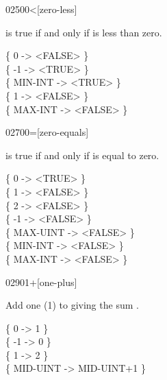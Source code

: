 \begin{worddef}[0less]{0250}{0<}[zero-less]
\item {}

	 is true if and only if  is less than zero.

	\begin{defer}
	\testing
		\{       0  -> <FALSE> \} \\
		\{      -1  -> <TRUE>  \} \\
		\{ MIN-INT  -> <TRUE>  \} \\
		\{       1  -> <FALSE> \} \\
		\{ MAX-INT  -> <FALSE> \}
	\end{defer}
\end{worddef}


\begin{worddef}{0270}{0=}[zero-equals]
\item {}

	 is true if and only if  is equal to zero.

	\begin{defer}
	\testing
		\{  0  -> <TRUE>  \} \\
		\{  1  -> <FALSE> \} \\
		\{  2  -> <FALSE> \} \\
		\{ -1  -> <FALSE> \} \\
		\{ MAX-UINT  -> <FALSE> \} \\
		\{ MIN-INT   -> <FALSE> \} \\
		\{ MAX-INT   -> <FALSE> \}
	\end{defer}
\end{worddef}


\begin{worddef}{0290}{1+}[one-plus]
\item {}

	Add one (1) to  giving the sum
	\param{n_2|u_2}.

	\begin{defer}
	\testing
		\{        0  ->          1 \} \\
		\{       -1  ->          0 \} \\
		\{        1  ->          2 \} \\
		\{ MID-UINT  -> MID-UINT+1 \}
	\end{defer}
\end{worddef}


